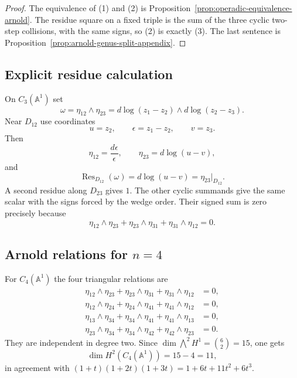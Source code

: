 \begin{proof}
The equivalence of \textup{(1)} and \textup{(2)} is
Proposition~\ref{prop:operadic-equivalence-arnold}. The residue square
on a fixed triple is the sum of the three cyclic two-step collisions,
with the same signs, so \textup{(2)} is exactly \textup{(3)}.
The last sentence is Proposition~\ref{prop:arnold-genus-split-appendix}.
\end{proof}

\subsection{Explicit residue calculation}

\begin{computation}\label{comp:explicit-residues}
On \(C_3(\mathbb{A}^1)\) set
\[
\omega=\eta_{12}\wedge\eta_{23}
=d\log(z_1-z_2)\wedge d\log(z_2-z_3).
\]
Near \(D_{12}\) use coordinates
\[
u=z_2,\qquad \epsilon=z_1-z_2,\qquad v=z_3.
\]
Then
\[
\eta_{12}=\frac{d\epsilon}{\epsilon},
\qquad
\eta_{23}=d\log(u-v),
\]
and
\[
\operatorname{Res}_{D_{12}}(\omega)
=d\log(u-v)=\eta_{23}|_{D_{12}}.
\]
A second residue along \(D_{23}\) gives \(1\). The other cyclic
summands give the same scalar with the signs forced by the wedge order.
Their signed sum is zero precisely because
\[
\eta_{12}\wedge\eta_{23}
+\eta_{23}\wedge\eta_{31}
+\eta_{31}\wedge\eta_{12}=0.
\]
\end{computation}

\subsection{\texorpdfstring{Arnold relations for $n=4$}{Arnold relations for n=4}}

\begin{computation}\label{comp:arnold-n4}
For \(C_4(\mathbb{A}^1)\) the four triangular relations are
\begin{align*}
\eta_{12}\wedge\eta_{23}+\eta_{23}\wedge\eta_{31}
+\eta_{31}\wedge\eta_{12}&=0,\\
\eta_{12}\wedge\eta_{24}+\eta_{24}\wedge\eta_{41}
+\eta_{41}\wedge\eta_{12}&=0,\\
\eta_{13}\wedge\eta_{34}+\eta_{34}\wedge\eta_{41}
+\eta_{41}\wedge\eta_{13}&=0,\\
\eta_{23}\wedge\eta_{34}+\eta_{34}\wedge\eta_{42}
+\eta_{42}\wedge\eta_{23}&=0.
\end{align*}
They are independent in degree two. Since
\(\dim \bigwedge^2 H^1=\binom{6}{2}=15\), one gets
\[
\dim H^2(C_4(\mathbb{A}^1))=15-4=11,
\]
in agreement with
\((1+t)(1+2t)(1+3t)=1+6t+11t^2+6t^3\).
\end{computation}


